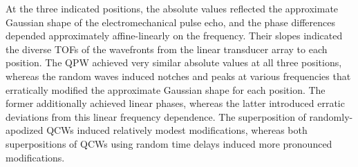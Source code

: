 At
the three indicated positions,
the absolute values reflected
the approximate Gaussian shape of
the electromechanical pulse echo, and
the phase differences depended approximately affine-linearly on
the frequency.
Their slopes indicated
the diverse \acp{TOF} of
the wavefronts from
the linear transducer array to
each position.
The \ac{QPW} achieved
very similar absolute values at
all three positions, whereas
the random waves induced
notches and peaks at
various frequencies that
erratically modified
the approximate Gaussian shape for
each position.
The former additionally achieved
linear phases, whereas
the latter introduced
erratic deviations from
this linear frequency dependence.
The superposition of
randomly-apodized \acp{QCW} induced
relatively modest modifications, whereas
both superpositions of
\acp{QCW} using
random time delays induced
more pronounced modifications.
